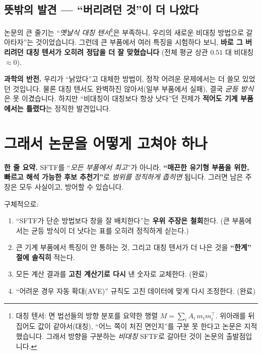 \documentclass[11pt,a4paper]{article}
\begin{document}
\subsection{뜻밖의 발견 — ``버리려던 것''이 더 나았다}

논문의 큰 줄기는 ``\emph{옛날식 대칭 텐서}\footnote{대칭 텐서: 면 법선들의 방향 분포를
요약한 행렬 $M=\sum_i A_i\,m_i m_i^{\!\top}$. 위아래를 뒤집어도 값이 같아서(대칭),
``어느 쪽이 처진 면인지''를 구분 못 한다고 논문은 지적했습니다. 그래서 방향을
구분하는 \emph{비대칭} SFTF로 갈아탄 것이 논문의 출발점입니다.}은 부족하니, 우리의
새로운 비대칭 방법으로 갈아타자''는 것이었습니다. 그런데 큰 부품에서 여러 특징을
시험하다 보니, \textbf{바로 그 버리려던 대칭 텐서가 오히려 정답을 더 잘 맞혔습니다}
(전체 평균 상관 $0.51$ 대 비대칭 $\approx 0$).

\begin{notebox}
\textbf{과학의 반전.} 우리가 ``낡았다''고 대체한 방법이, 정작 어려운 문제에서는 더
쓸모 있었던 것입니다. 물론 대칭 텐서도 완벽하진 않아서(일부 부품에서 실패), 결국
\emph{균등 방식}은 못 이겼습니다. 하지만 ``비대칭이 대칭보다 항상 낫다''던 전제가
\textbf{적어도 기계 부품에서는 틀렸다}는 정직한 발견입니다.
\end{notebox}

\section{그래서 논문을 어떻게 고쳐야 하나}

\begin{readbox}
\textbf{한 줄 요약.} SFTF를 ``\emph{모든 부품에서 최고}''가 아니라, \textbf{``매끈한
유기형 부품을 위한, 빠르고 해석 가능한 후보 추천기''}로 \emph{범위를 정직하게 좁히면}
됩니다. 그러면 남은 주장은 모두 사실이고, 방어할 수 있습니다.
\end{readbox}

구체적으로:
\begin{enumerate}[leftmargin=1.5em]
  \item ``SFTF가 단순 방법보다 창을 잘 배치한다''는 \textbf{우위 주장은 철회}한다.
        (큰 부품에서는 균등 방식이 더 낫다는 표를 오히려 정직하게 싣는다.)
  \item 큰 기계 부품에서 특징이 안 통하는 것, 그리고 대칭 텐서가 더 나은 것을
        \textbf{``한계'' 절에 솔직히} 적는다.
  \item 모든 계산 결과를 \textbf{고친 계산기로 다시} 낸 숫자로 교체한다. (완료)
  \item ``어려운 경우 자동 확대(AVE)'' 규칙도 고친 데이터에 맞게 다시 조정한다. (완료)
\end{enumerate}
\end{document}
